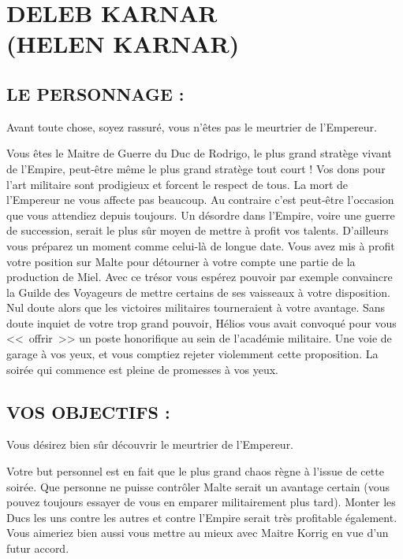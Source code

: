 \documentclass[14pt,twocolumn]{extarticle}
\begin{document}
\section{DELEB KARNAR\\(HELEN KARNAR)}

\subsection{LE PERSONNAGE :}

Avant toute chose, soyez rassuré, vous n'êtes pas le meurtrier de l'Empereur.

Vous êtes le Maitre de Guerre du Duc de Rodrigo, le plus grand stratège vivant
de l'Empire, peut-être même le plus grand stratège tout court ! Vos dons pour
l'art militaire sont prodigieux et forcent le respect de tous. La mort de
l'Empereur ne vous affecte pas beaucoup. Au contraire c'est peut-être
l'occasion que vous attendiez depuis toujours. Un désordre dans l'Empire, voire
une guerre de succession, serait le plus sûr moyen de mettre à profit vos
talents. D'ailleurs vous préparez un moment comme celui-là de longue date.
Vous avez mis à profit votre position sur Malte pour détourner à votre compte
une partie de la production de Miel. Avec ce trésor vous espérez pouvoir par
exemple convaincre la Guilde des Voyageurs de mettre certains de ses vaisseaux
à votre disposition. Nul doute alors que les victoires militaires tourneraient
à votre avantage. Sans doute inquiet de votre trop grand pouvoir, Hélios vous
avait convoqué pour vous <<~offrir~>> un poste honorifique au sein de
l'académie militaire. Une voie de garage à vos yeux, et vous comptiez rejeter
violemment cette proposition. La soirée qui commence est pleine de promesses à
vos yeux.

\subsection{VOS OBJECTIFS :}

Vous désirez bien sûr découvrir le meurtrier de l'Empereur.

Votre but personnel est en fait que le plus grand chaos règne à l'issue de
cette soirée. Que personne ne puisse contrôler Malte serait un avantage certain
(vous pouvez toujours essayer de  vous en emparer militairement plus tard).
Monter les Ducs les uns contre les autres et contre l'Empire serait très
profitable également. Vous aimeriez bien aussi vous mettre au mieux avec
Maitre Korrig en vue d'un futur accord.
\end{document}
